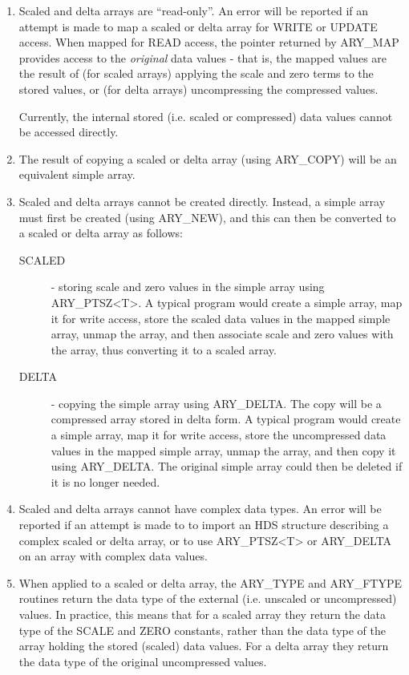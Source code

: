 \documentclass[twoside,11pt,nolof]{starlink}
\begin{document}
\begin{enumerate}

\item Scaled and delta arrays are ``read-only''. An error will be reported if
an attempt is made to map a scaled or delta array for WRITE or UPDATE
access. When mapped for READ access, the pointer returned by ARY\_MAP
provides access to the \emph{original} data values - that is, the mapped
values are the result of (for scaled arrays) applying the scale and zero
terms to the stored values, or (for delta arrays) uncompressing the
compressed values.

Currently, the internal stored (i.e. scaled or compressed) data values
cannot be accessed directly.

\item The result of copying a scaled or delta array (using ARY\_COPY) will be
an equivalent simple array.

\item Scaled and delta arrays cannot be created directly. Instead, a simple
array must first be created (using ARY\_NEW), and this can then be converted
to a scaled or delta array as follows:

\begin{description}

\item[SCALED] - storing scale and zero values in the simple array using
ARY\_PTSZ<T>. A typical program would create a simple array, map it for
write access, store the scaled data values in the mapped simple array,
unmap the array, and then associate scale and zero values with the array,
thus converting it to a scaled array.

\item[DELTA] - copying the simple array using ARY\_DELTA. The copy will
be a compressed array stored in delta form. A typical program would create
a simple array, map it for write access, store the uncompressed data
values in the mapped simple array, unmap the array, and then copy it using
ARY\_DELTA. The original simple array could then be deleted if it is no
longer needed.

\end{description}

\item Scaled and delta arrays cannot have complex data types. An error will be
reported if an attempt is made to to import an HDS structure describing a
complex scaled or delta array, or to use ARY\_PTSZ<T> or ARY\_DELTA on an
array with complex data values.

\item When applied to a scaled or delta array, the ARY\_TYPE and ARY\_FTYPE
routines return the data type of the external (i.e. unscaled or uncompressed)
values. In practice, this means that for a scaled array they return the data
type of the SCALE and ZERO constants, rather than the data type of the array
holding the stored (scaled) data values. For a delta array they return
the data type of the original uncompressed values.

\end{enumerate}
\end{document}
